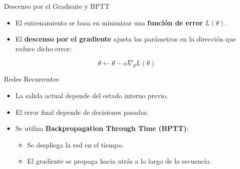 \begin{frame}{Descenso por el Gradiente y BPTT}
    \begin{itemize}
        \item El entrenamiento se basa en minimizar una \textbf{función de error} $L(\theta)$.
        \item El \textbf{descenso por el gradiente} ajusta los parámetros en la dirección que reduce dicho error:
    \end{itemize}

    \vspace{0.2cm}
    \[
        \theta \leftarrow \theta - \alpha \nabla_\theta L(\theta)
    \]

    \vspace{0.3cm}
    \begin{block}{Redes Recurrentes}
        \begin{itemize}
            \item La salida actual depende del estado interno previo.
            \item El error final depende de decisiones pasadas.
            \item Se utiliza \textbf{Backpropagation Through Time (BPTT)}:
            \begin{itemize}
                \item Se despliega la red en el tiempo.
                \item El gradiente se propaga hacia atrás a lo largo de la secuencia.
            \end{itemize}
        \end{itemize}
    \end{block}
\end{frame}
    
